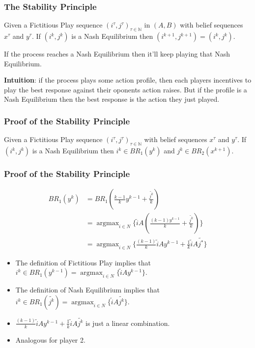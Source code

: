 \documentclass[pdf]{beamer}
\newcommand{\pstrat}{\widetilde}
\DeclareMathOperator*{\argmax}{argmax}
\begin{document}
\begin{frame}
    \frametitle{The Stability Principle}
    \begin{theorem}
        Given a Fictitious Play sequence $(i^\tau, j^\tau)_{\tau \in \mathbb{N}}$ in $(A, B)$ with belief sequences $x^\tau$ and $y^\tau$. If $(i^k, j^k)$ is a Nash Equilibrium then $(i^{k+1}, j^{k+1}) = (i^k, j^k)$.
    \end{theorem}
    \pause If the process reaches a Nash Equilibrium then it'll keep playing that Nash Equilibrium.

    \pause \textbf{Intuition}: if the process plays some action profile, then each players incentives to play the best response against their oponents action raises. But if the profile is a Nash Equilibrium then the best response is the action they just played.
\end{frame}

\begin{frame}
    \frametitle{Proof of the Stability Principle}
    \begin{lemma}[1]
        Given a Fictitious Play sequence $(i^\tau, j^\tau)_{\tau \in \mathbb{N}}$ with belief sequences $x^\tau$ and $y^\tau$. If $(i^k, j^k)$ is a Nash Equilibrium then $i^k \in BR_1(y^{k})$ and $j^k \in BR_2(x^{k+1})$.
    \end{lemma}
\end{frame}

\begin{frame}
    \frametitle{Proof of the Stability Principle}
    \begin{align*}
        BR_1(y^k) &= BR_1(\frac{k - 1}{k} y^{k-1} + \frac{ \pstrat{j^k}}{k}) \\
        &= \argmax_{i \in N} \{\pstrat{i} A(\frac{(k - 1)y^{k-1}}{k} + \frac{ \pstrat{j^k}}{k})\}\\
        &= \argmax_{i \in N} \{\frac{(k - 1)}{k}\pstrat{i} Ay^{k-1} + \frac{1}{k}\pstrat{i} A \pstrat{j^*}\}
    \end{align*}
    \begin{itemize}
        \item \pause The definition of Fictitious Play implies that $i^k \in BR_1(y^{k-1}) = \argmax_{i \in N}\{\pstrat{i}Ay^{k-1}\}$.
        \item \pause The definition of Nash Equilibrium implies that $i^k \in BR_1(\pstrat{j^k}) = \argmax_{i \in N}\{\pstrat{i} A \pstrat{j^k}\}$.
        \item \pause $\frac{(k - 1)}{k}\pstrat{i}Ay^{k-1} + \frac{1}{k}\pstrat{i} A \pstrat{j^k}$ is just a linear combination.
        \item \pause Analogous for player 2.
    \end{itemize}
\end{frame}
\end{document}
